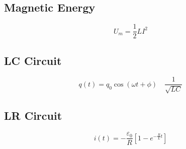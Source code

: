 \documentclass[Master.tex]{subfiles}
\begin{document}
\begin{multicols}{2}
		  \subsection{Magnetic Energy}
				   \[
						    U_{m} = \frac{1}{2}LI^{2}
				   \]

		  \subsection{LC Circuit}
				   \[
						    q(t) = q_0 \cos (\omega t + \phi ) \quad \frac{1}{\sqrt{LC} }
				   \]

		  \subsection{LR Circuit}
				   \[
						    i(t) = - \frac{\varepsilon_{0}}{R}[1 - e^{-\frac{R}{L}t}]
				   \]

		  \subsection{}
\end{multicols}
\end{document}
